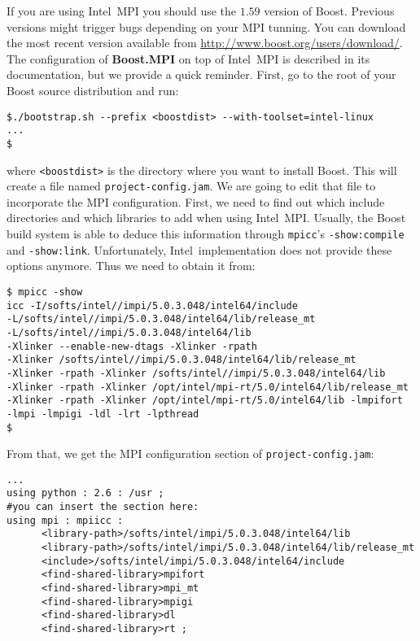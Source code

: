 \documentclass[twoside,final,onecolumn]{article}
\newcommand{\intel}{Intel\textregistered}
\begin{document}
If you are using \intel\ MPI you should use the $1.59$ version of Boost. Previous versions might trigger bugs depending on your MPI tunning.
You can download the most recent version available from \url{http://www.boost.org/users/download/}.
The configuration of {\bf Boost.MPI} on top of \intel\ MPI is described in its documentation, but we provide a quick reminder.
First, go to the root of your Boost source distribution and run:
\begin{framed}
\begin{verbatim}
$./bootstrap.sh --prefix <boostdist> --with-toolset=intel-linux
...
$
\end{verbatim}
\end{framed}
where {\verb+<boostdist>+} is the directory where you want to install Boost.
\newline
\newline
This will create a file named {\tt project-config.jam}. We are going to edit that file to incorporate the MPI configuration.
First, we need to find out which include directories and which libraries to add when using \intel\ MPI.
Usually, the Boost build system is able to deduce this information through {\tt mpicc}'s {\tt -show:compile} and {\tt -show:link}.
Unfortunately, \intel\ implementation does not provide these options anymore. Thus we need to obtain it from:
\begin{framed}
\begin{verbatim}
$ mpicc -show
icc -I/softs/intel//impi/5.0.3.048/intel64/include
-L/softs/intel//impi/5.0.3.048/intel64/lib/release_mt
-L/softs/intel//impi/5.0.3.048/intel64/lib
-Xlinker --enable-new-dtags -Xlinker -rpath
-Xlinker /softs/intel//impi/5.0.3.048/intel64/lib/release_mt
-Xlinker -rpath -Xlinker /softs/intel//impi/5.0.3.048/intel64/lib
-Xlinker -rpath -Xlinker /opt/intel/mpi-rt/5.0/intel64/lib/release_mt
-Xlinker -rpath -Xlinker /opt/intel/mpi-rt/5.0/intel64/lib -lmpifort
-lmpi -lmpigi -ldl -lrt -lpthread
$ 
\end{verbatim}
\end{framed}

From that, we get the MPI configuration section of {\tt project-config.jam}:

\begin{framed}
\begin{verbatim}
...
using python : 2.6 : /usr ; 
#you can insert the section here:
using mpi : mpiicc : 
      <library-path>/softs/intel/impi/5.0.3.048/intel64/lib
      <library-path>/softs/intel/impi/5.0.3.048/intel64/lib/release_mt
      <include>/softs/intel/impi/5.0.3.048/intel64/include
      <find-shared-library>mpifort
      <find-shared-library>mpi_mt
      <find-shared-library>mpigi
      <find-shared-library>dl
      <find-shared-library>rt ;
\end{verbatim}
\end{framed}
\end{document}

